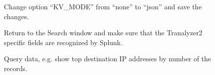 \documentclass[documentation]{subfiles}
\begin{document}
\begin{figure}[!ht]
    \centering
    \caption{Change option ``KV\_MODE'' from ``none'' to ``json'' and save
        the changes.}
\end{figure}

\begin{figure}[!ht]
    \centering
    \caption{Return to the Search window and make sure that the Tranalyzer2
             specific fields are recognized by Splunk.}
\end{figure}

\begin{figure}[!ht]
    \centering
    \caption{Query data, e.g. show top destination IP addresses by number of the records.}
\end{figure}
\end{document}
